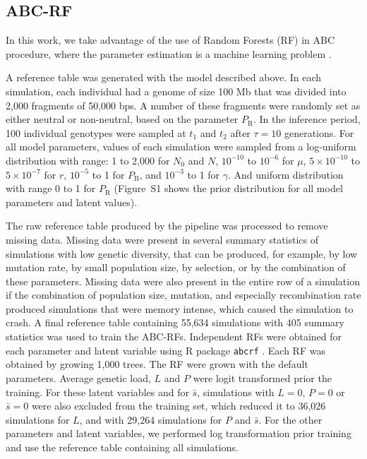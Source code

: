 \documentclass[a4paper, 12pt]{article}
\begin{document}
\subsection*{ABC-RF}

In this work, we take advantage of the use of Random Forests (RF) in ABC procedure, where the parameter estimation is a machine learning problem \citep{Pudlo:2016il, Raynal:2019jj}.

A reference table was generated with the model described above. In each simulation, each individual had a genome of size 100 Mb that was divided into 2,000 fragments of 50,000 bps. A number of these fragments were randomly set as either neutral or non-neutral, based on the parameter $P_{\mathrm{R}}$. In the inference period, 100 individual genotypes were sampled at $t_1$ and $t_2$ after $\tau = 10$  generations. For all model parameters, values of each simulation were sampled from a log-uniform distribution with range: 1 to 2,000 for $N_\mathrm{0}$ and $N$, $10^{-10}$ to  $10^{-6}$ for $\mu$,  $5\times 10^{-10}$ to $5\times 10^{-7}$  for $r$, $10^{-5}$ to 1 for $P_{\mathrm{B}}$, and $10^{-3}$ to 1 for $\gamma$.  And uniform distribution with range 0 to 1 for $P_{\mathrm{R}}$ (Figure~S1 shows the prior distribution for all model parameters and latent values).

The raw reference table produced by the pipeline was processed to remove missing data. Missing data were present in several summary statistics of simulations with low genetic diversity, that can be produced, for example, by low mutation rate, by small population size, by selection, or by the combination of these parameters. Missing data were also present in the entire row of a simulation if the combination of population size, mutation, and especially recombination rate produced simulations that were memory intense, which caused the simulation to crash. A final reference table containing 55,634 simulations with 405 summary statistics was used to train the ABC-RFs. Independent RFs were obtained for each parameter and latent variable using R package \texttt{abcrf} \citep{Pudlo:2016il, Raynal:2019jj}. Each RF was obtained by growing 1,000 trees. The RF were grown with the default parameters. Average genetic load, $L$ and $P$ were logit transformed prior the training. For these latent variables and for $\bar{s}$, simulations with $L=0$, $P=0$ or $\bar{s} = 0$ were also excluded from the training set, which reduced it to 36,026 simulations for $L$, and with 29,264 simulations for $P$ and $\bar{s}$. For the other parameters and latent variables, we performed log transformation prior training and use the reference table containing all simulations.
\end{document}
